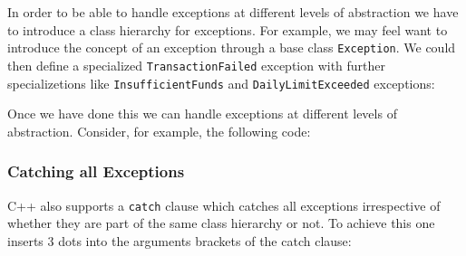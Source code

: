 In order to be able to handle exceptions at different levels of abstraction
we have to introduce a class hierarchy for exceptions. For example, we may
feel want to introduce the concept of an exception through a base class
\verb+Exception+. We could then define a specialized \verb+TransactionFailed+
exception with further specializetions like \verb+InsufficientFunds+
and \verb+DailyLimitExceeded+ exceptions:


Once we have done this we can handle exceptions at different levels of 
abstraction. Consider, for example, the following code:



\subsubsection{Catching all Exceptions}

C++ also supports a \verb+catch+ clause which catches all exceptions
irrespective of whether they are part of the same class hierarchy or
not. To achieve this one inserts 3 dots into the arguments brackets
of the catch clause:




